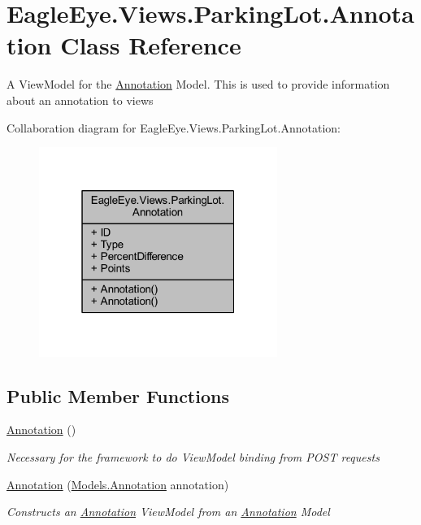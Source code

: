 \hypertarget{class_eagle_eye_1_1_views_1_1_parking_lot_1_1_annotation}{}\section{Eagle\+Eye.\+Views.\+Parking\+Lot.\+Annotation Class Reference}
\label{class_eagle_eye_1_1_views_1_1_parking_lot_1_1_annotation}


A View\+Model for the \mbox{\hyperlink{class_eagle_eye_1_1_views_1_1_parking_lot_1_1_annotation}{Annotation}} Model. This is used to provide information about an annotation to views  




Collaboration diagram for Eagle\+Eye.\+Views.\+Parking\+Lot.\+Annotation\+:
\nopagebreak
\begin{figure}[H]
\begin{center}
\leavevmode
\includegraphics[width=220pt]{class_eagle_eye_1_1_views_1_1_parking_lot_1_1_annotation__coll__graph}
\end{center}
\end{figure}
\subsection*{Public Member Functions}
\begin{DoxyCompactItemize}
\item 
\mbox{\hyperlink{class_eagle_eye_1_1_views_1_1_parking_lot_1_1_annotation_a219a85017ab1fb54045c686bd49e2e32}{Annotation}} ()
\begin{DoxyCompactList}\small\item\em Necessary for the framework to do View\+Model binding from P\+O\+ST requests \end{DoxyCompactList}\item 
\mbox{\hyperlink{class_eagle_eye_1_1_views_1_1_parking_lot_1_1_annotation_a49916dc64f4e7e0a7ab9883c68abf103}{Annotation}} (\mbox{\hyperlink{class_eagle_eye_1_1_models_1_1_annotation}{Models.\+Annotation}} annotation)
\begin{DoxyCompactList}\small\item\em Constructs an \mbox{\hyperlink{class_eagle_eye_1_1_views_1_1_parking_lot_1_1_annotation}{Annotation}} View\+Model from an \mbox{\hyperlink{class_eagle_eye_1_1_views_1_1_parking_lot_1_1_annotation}{Annotation}} Model \end{DoxyCompactList}\end{DoxyCompactItemize}
